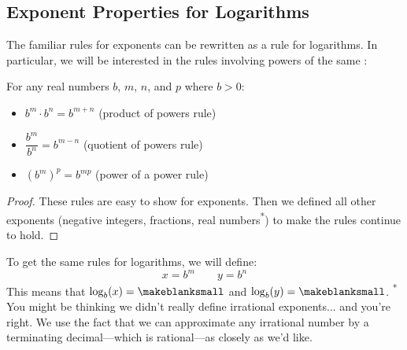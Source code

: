 \subsection{Exponent Properties for Logarithms} 
The familiar rules for exponents can be rewritten as a rule for logarithms. In particular, we will be interested in the rules involving powers of the same \makeblank[1in]:
\begin{theorem}
For any real numbers $b$, $m$, $n$, and $p$ where $b>0$:
\begin{itemize}
\item $b^m\cdot b^n = b^{m+n}$ (product of powers rule)
\item $\dfrac{b^m}{b^n} = b^{m-n}$ (quotient of powers rule)
\item $\left(b^m\right)^p=b^{mp}$ (power of a power rule)
\end{itemize}
\end{theorem}
\begin{proof}
These rules are easy to show for \makeblank exponents. Then we defined all other exponents (negative integers, fractions, real numbers\textsuperscript{*}) to make the rules continue to hold.
\end{proof}
To get the same rules for logarithms, we will define:
\[
x=b^m
\qquad
y=b^n
\]
This means that $\log_b(x)=\makeblanksmall$ and $\log_b(y)=\makeblanksmall$.
\vfill
\textsuperscript{*} You might be thinking we didn't really define irrational exponents... and you're right. We use the fact that we can approximate any irrational number by a terminating decimal---which is rational---as closely as we'd like.